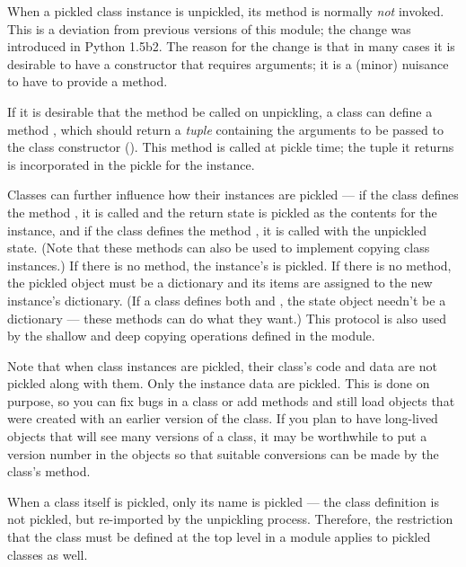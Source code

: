 
When a pickled class instance is unpickled, its  method
is normally \emph{not} invoked.   This is a deviation
from previous versions of this module; the change was introduced in
Python 1.5b2.  The reason for the change is that in many cases it is
desirable to have a constructor that requires arguments; it is a
(minor) nuisance to have to provide a  method.

If it is desirable that the  method be called on
unpickling, a class can define a method ,
which should return a \emph{tuple} containing the arguments to be
passed to the class constructor ().  This method is
called at pickle time; the tuple it returns is incorporated in the
pickle for the instance.

Classes can further influence how their instances are pickled --- if the class
defines the method , it is called and the return
state is pickled as the contents for the instance, and if the class
defines the method , it is called with the
unpickled state.  (Note that these methods can also be used to
implement copying class instances.)  If there is no
 method, the instance's  is
pickled.  If there is no  method, the pickled
object must be a dictionary and its items are assigned to the new
instance's dictionary.  (If a class defines both 
and , the state object needn't be a dictionary
--- these methods can do what they want.)  This protocol is also used
by the shallow and deep copying operations defined in the 
module.

Note that when class instances are pickled, their class's code and
data are not pickled along with them.  Only the instance data are
pickled.  This is done on purpose, so you can fix bugs in a class or
add methods and still load objects that were created with an earlier
version of the class.  If you plan to have long-lived objects that
will see many versions of a class, it may be worthwhile to put a version
number in the objects so that suitable conversions can be made by the
class's  method.

When a class itself is pickled, only its name is pickled --- the class
definition is not pickled, but re-imported by the unpickling process.
Therefore, the restriction that the class must be defined at the top
level in a module applies to pickled classes as well.

